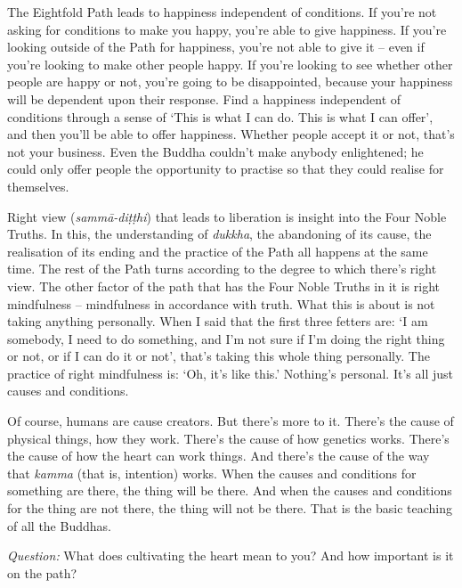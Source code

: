 The Eightfold Path leads to happiness independent of conditions. If you're not
asking for conditions to make you happy, you're able to give happiness. If
you're looking outside of the Path for happiness, you're not able to give it --
even if you're looking to make other people happy. If you're looking to see
whether other people are happy or not, you're going to be disappointed, because
your happiness will be dependent upon their response. Find a happiness
independent of conditions through a sense of `This is what I can do. This is
what I can offer', and then you'll be able to offer happiness. Whether people
accept it or not, that's not your business. Even the Buddha couldn't make
anybody enlightened; he could only offer people the opportunity to practise so
that they could realise for themselves.

Right view (\emph{sammā-diṭṭhi}) that leads to liberation is insight
into the Four Noble Truths. In this, the understanding of \emph{dukkha}, the
abandoning of its cause, the realisation of its ending and the practice of the
Path all happens at the same time. The rest of the Path turns according to the
degree to which there's right view. The other factor of the path that has the
Four Noble Truths in it is right mindfulness -- mindfulness in accordance with
truth. What this is about is not taking anything personally. When I said that
the first three fetters are: `I am somebody, I need to do something, and I'm not
sure if I'm doing the right thing or not, or if I can do it or not', that's
taking this whole thing personally. The practice of right mindfulness is: `Oh,
it's like this.' Nothing's personal. It's all just causes and conditions.

Of course, humans are cause creators. But there's more to it. There's the cause
of physical things, how they work. There's the cause of how genetics works.
There's the cause of how the heart can work things. And there's the cause of the
way that \emph{kamma} (that is, intention) works. When the causes and conditions
for something are there, the thing will be there. And when the causes and
conditions for the thing are not there, the thing will not be there. That is the
basic teaching of all the Buddhas.

\bigskip

\emph{Question:} What does cultivating the heart mean to you? And how important is it
on the path?

